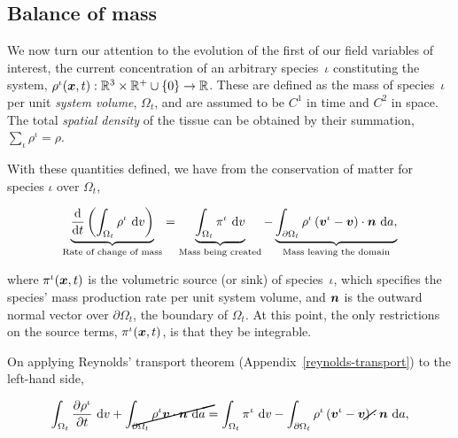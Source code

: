 \subsection{Balance of mass}
\label{eu-balance-of-mass}

We now turn our attention to the evolution of the first of our field
variables of interest, the current concentration of an arbitrary
species~$\iota$ constituting the system, $\rho^{\iota}(\mbox{\boldmath$ x$},t):
\mathbb{R}^3\times\mathbb{R}^{+}\cup\{0\} \rightarrow
\mathbb{R}$. These are defined as the mass of species~$\iota$ per unit
       {\em system volume}, $\Omega_{t}$, and are assumed to be
       $\mathit{C}^{1}$ in time and $\mathit{C}^{2}$ in space. The
       total {\em spatial density} of the tissue can be obtained by
       their summation, $\sum\limits_{\iota}\rho^\iota = \rho$.

With these quantities defined, we have from the conservation of matter
for species $\iota$ over $\Omega_{t}$,

\begin{equation}
\underbrace{\frac{\mathrm{d}} {\mathrm{d}t}\left(\int_{\Omega_{t}}
  \rho^{\iota} \ \mathrm{d}v \right)}_{\text{Rate of change of mass}}
= \underbrace{\int_{\Omega_{t}} \pi^{\iota} \ \mathrm{d}v}_{\text{Mass
    being created}} - \underbrace{\int_{\partial \Omega_{t}}
  \rho^{\iota} \left(\mbox{\boldmath$ v$}^{\iota} - \mbox{\boldmath$ v$}\right) \cdot
  \mbox{\boldmath$ n$}\ \mathrm{d}a,}_{\text{Mass leaving the domain}}
\label{eu-globalbalanceofmass}
\end{equation}

\noindent where $\pi^{\iota}(\mbox{\boldmath$ x$},t)$ is the volumetric source (or
sink) of species~$\iota$, which specifies the species' mass production
rate per unit system volume, and $\mbox{\boldmath$ n$}$ is the outward normal vector
over $\partial \Omega_{t}$, the boundary of $\Omega_{t}$. At this
point, the only restrictions on the source terms,
$\pi^{\iota}(\mbox{\boldmath$ x$},t)$, is that they be integrable.

On applying Reynolds' transport theorem
(Appendix~\ref{reynolds-transport}) to the left-hand side,

\begin{equation*}
\int_{\Omega_{t}} \frac{\partial \rho^{\iota}}{\partial t}
\ \mathrm{d}v + \cancel{\int_{\partial \Omega_{t}} \rho^{\iota} \bv
  \cdot \bn\ \mathrm{d}a} = \int_{\Omega_{t}} \pi^{\iota}
\ \mathrm{d}v - \int_{\partial \Omega_{t}} \rho^{\iota}
\left(\bv^{\iota} - \cancel{\bv}\right) \cdot \bn\ \mathrm{d}a,
\end{equation*}

